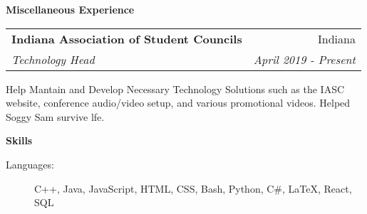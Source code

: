 \documentclass[letterpaper,11pt]{article}
\makeatletter
\newcommand{\resheading}[1]{ \begin{trixiematel}\textbf{#1}\end{trixiematel}}
\newcommand{\ressubheading}[4]{
\begin{tabular*}{6.5in}{l@{\extracolsep{\fill}}r}
                \textbf{#1} & #2 \\
                \textit{#3} & \textit{#4} \\
\end{tabular*}\vspace{2pt}}
\makeatother
\begin{document}
\resheading{Miscellaneous Experience}
\begin{description}
\item
\ressubheading{Indiana Association of Student Councils}{Indiana}{Technology Head}{April 2019 - Present} 


Help Mantain and Develop Necessary Technology Solutions such as the IASC website, conference audio/video setup, and various promotional videos. Helped Soggy Sam survive lfe.

\end{description}\resheading{Skills}

\begin{description}
\item[Languages:]
C++, Java, JavaScript, HTML, CSS, Bash, Python, C\#, \LaTeX, React, SQL\end{description}
\end{document}
